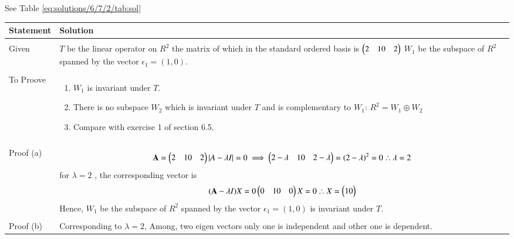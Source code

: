 See Table \ref{eq:solutions/6/7/2/tab:sol}

\onecolumn
\begin{longtable}{|p{5cm}|p{13cm}|}
\hline
\textbf{Statement} &\textbf{Solution}\\
\hline
& \\ 
Given
& \parbox{12cm}{$T$ be the linear operator on $R^2$
the matrix of which in the standard ordered basis is $\myvec{2&1\\0&2}$ \\
$W_1$ be the subspace of $R^2$ spanned by the vector $\epsilon_1=(1,0)$.\\}\\
\hline
& \\ 
To Proove
& \parbox{12cm}{\begin{enumerate}
\item {$W_1$ is invariant under $T$.}
\item{There is no subspace $W_2$ which is invariant under $T$ and is complementary to $W_1$:
$R^2=W_1\oplus W_2$}
\item{Compare with exercise 1 of section 6.5.}
\end{enumerate}}
\\
& \\
\hline
Proof (a) &
\parbox{12cm}{\begin{align}
    \vec{A}=\myvec{2&1\\0&2}\\
    \lvert A -\lambda I \rvert=0\\
      \implies \myvec{2-\lambda & 1\\0& 2- \lambda} \\
    = (2-\lambda)^2=0\\
    \therefore \lambda =2
    \end{align}
    for $\lambda = 2$ , the corresponding vector is
    \begin{align}
    (\vec{A}-\lambda I)X=0\\
    \myvec{0&1\\0&0}X=0\\
    \therefore X=\myvec{1\\0}
    \end{align}
    Hence, $W_1$ be the subspace of $R^2$ spanned by the vector $\epsilon_1=(1,0)$ is invariant under $T$.\\
}
\\
\hline
& \\
Proof (b) &
\parbox{12cm}{ Corresponding to $\lambda=2$, \\ Among, two eigen vectors only one is independent and other one is dependent.\\
}
\end{longtable}
